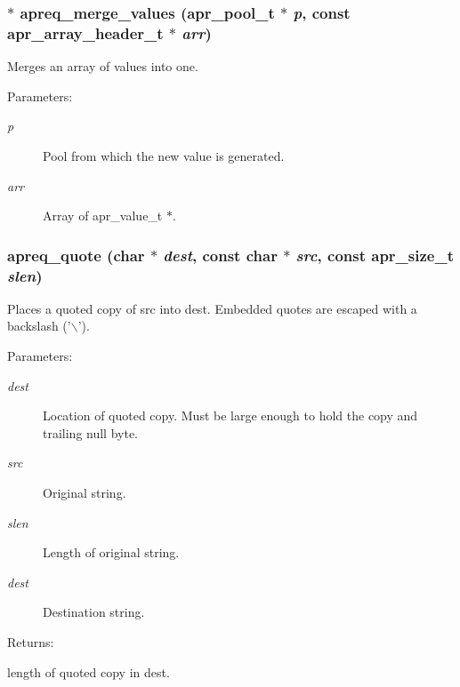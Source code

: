 \subsubsection{$\ast$ apreq\_\-merge\_\-values ({\bf apr\_\-pool\_\-t} $\ast$ {\em p}, const {\bf apr\_\-array\_\-header\_\-t} $\ast$ {\em arr})}\label{group__Utils_a5}


Merges an array of values into one. \begin{Desc}
\item[Parameters: ]\par
\begin{description}
\item[{\em 
p}]Pool from which the new value is generated. \item[{\em 
arr}]Array of apr\_\-value\_\-t $\ast$. \end{description}
\end{Desc}
\subsubsection{ apreq\_\-quote (char $\ast$ {\em dest}, const char $\ast$ {\em src}, const {\bf apr\_\-size\_\-t} {\em slen})}\label{group__Utils_a10}


Places a quoted copy of src into dest. Embedded quotes are escaped with a backslash ('$\backslash$'). \begin{Desc}
\item[Parameters: ]\par
\begin{description}
\item[{\em 
dest}]Location of quoted copy. Must be large enough to hold the copy and trailing null byte. \item[{\em 
src}]Original string. \item[{\em 
slen}]Length of original string. \item[{\em 
dest}]Destination string. \end{description}
\end{Desc}
\begin{Desc}
\item[Returns: ]\par
length of quoted copy in dest. \end{Desc}
